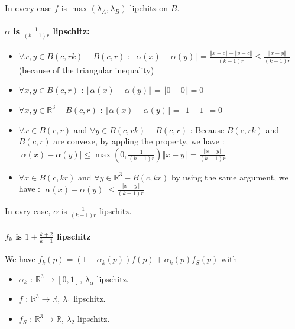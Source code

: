 \documentclass[a4paper,12pt]{article}
\begin{document}
In every case $f$ is $\max(\lambda_A, \lambda_B)$ lipchitz on $B$.

\paragraph{$\alpha$ is $\frac{1}{(k-1)r}$ lipschitz:}

\begin{itemize}
	\item $\forall x, y \in B(c, rk) - B(c, r)$ : $\left\Vert \alpha(x) - \alpha(y) \right\Vert = \frac{\left\Vert x-c \right\Vert - \left\Vert y - c \right\Vert}{(k-1)r} \le \frac{\left\Vert x-y \right\Vert}{(k-1)r}$ (because of the triangular inequality)
	\item $\forall x, y \in B(c, r)$ : $\left\Vert \alpha(x) - \alpha(y) \right\Vert = \left\Vert 0 - 0 \right\Vert = 0$
	\item $\forall x, y \in \mathbb{R}^3 - B(c, r)$ : $\left\Vert \alpha(x) - \alpha(y) \right\Vert = \left\Vert 1 - 1 \right\Vert = 0$
		
	\item $\forall x \in B(c, r)$ and $\forall y \in B(c, rk) - B(c, r)$ : Because $B(c, rk)$ and $B(c, r)$ are convexe, by appling the property, we have : $\left| \alpha(x) - \alpha(y) \right| \le \max(0, \frac{1}{(k-1)r})\left\Vert x-y \right\Vert = \frac{\left\Vert x-y \right\Vert}{(k-1)r}$

	\item $\forall x \in B(c, kr)$ and $\forall y \in \mathbb{R}^3 - B(c, kr)$ by using the same argument, we have : $\left| \alpha(x) - \alpha(y) \right| \le \frac{\left\Vert x-y \right\Vert}{(k-1)r}$



\end{itemize}
In evry case, $\alpha$ is $\frac{1}{(k-1)r}$ lipschitz.

\paragraph{$f_k$ is $1 + \frac{k+2}{k-1}$ lipschitz} We have $f_k(p) = (1-\alpha_k(p))f(p) + \alpha_k(p)f_S(p)$ with
\begin{itemize}
	\item $\alpha_k$ : $\mathbb{R}^3 \to \left[0, 1\right]$, $\lambda_\alpha$ lipschitz.
	\item $f$ : $\mathbb{R}^3 \to \mathbb{R}$, $\lambda_1$ lipschitz.
	\item $f_S$ : $\mathbb{R}^3 \to \mathbb{R}$, $\lambda_2$ lipschitz.
\end{itemize}
\end{document}
